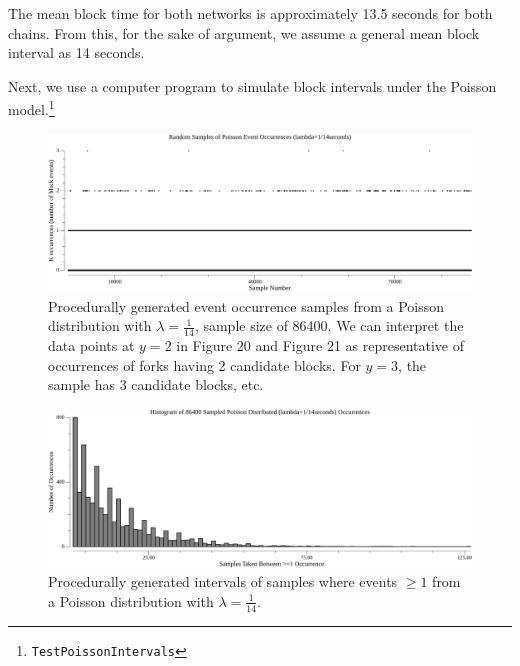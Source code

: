 \documentclass[11pt]{article}
\theoremstyle{plain}
\begin{document}
\clearpage

The mean block time for both networks is approximately 13.5 seconds for both chains.
From this, for the sake of argument, we assume a general mean block interval as 14 seconds.

Next, we use a computer program to simulate block intervals under the Poisson
model.\footnote{\texttt{TestPoissonIntervals}}

\begin{figure}[tph!]
    \label{vis_poisson_samples_events_86400}
    \centering
    \includegraphics[width=1.0\textwidth]{go-block-step/out/vis_poisson_samples_events_86400.png}
    \caption{
        Procedurally generated event occurrence samples from a Poisson distribution
        with $\lambda = \frac{1}{14}$, sample size of 86400.
        We can interpret the data points at $y=2$ in Figure 20 and Figure 21 as
        representative of occurrences of forks having 2 candidate blocks.
        For $y=3$, the sample has 3 candidate blocks, etc.
    }
\end{figure}

\begin{figure}[tph!]
    \label{vis_poisson_samples_eventintervals_hist}
    \centering
    \includegraphics[width=1.0\textwidth]{go-block-step/out/vis_poisson_samples_eventintervals_hist.png}
    \caption{
        Procedurally generated intervals of samples where events $\geq 1$ from
        a Poisson distribution with $\lambda = \frac{1}{14}$.
    }
\end{figure}
\end{document}
